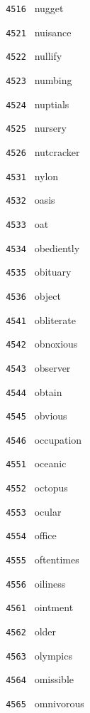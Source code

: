 \documentclass[11pt]{article}
\begin{document}
\begin{multicols}{6}
\noindent \texttt{ 4516 } nugget  \par
\vspace{3mm}
\noindent \texttt{ 4521 } nuisance  \par
\noindent \texttt{ 4522 } nullify  \par
\noindent \texttt{ 4523 } numbing  \par
\noindent \texttt{ 4524 } nuptials  \par
\noindent \texttt{ 4525 } nursery  \par
\noindent \texttt{ 4526 } nutcracker  \par
\vspace{3mm}
\noindent \texttt{ 4531 } nylon  \par
\noindent \texttt{ 4532 } oasis  \par
\noindent \texttt{ 4533 } oat  \par
\noindent \texttt{ 4534 } obediently  \par
\noindent \texttt{ 4535 } obituary  \par
\noindent \texttt{ 4536 } object  \par
\vspace{3mm}
\noindent \texttt{ 4541 } obliterate  \par
\noindent \texttt{ 4542 } obnoxious  \par
\noindent \texttt{ 4543 } observer  \par
\noindent \texttt{ 4544 } obtain  \par
\noindent \texttt{ 4545 } obvious  \par
\noindent \texttt{ 4546 } occupation  \par
\vspace{3mm}
\noindent \texttt{ 4551 } oceanic  \par
\noindent \texttt{ 4552 } octopus  \par
\noindent \texttt{ 4553 } ocular  \par
\noindent \texttt{ 4554 } office  \par
\noindent \texttt{ 4555 } oftentimes  \par
\noindent \texttt{ 4556 } oiliness  \par
\vspace{3mm}
\noindent \texttt{ 4561 } ointment  \par
\noindent \texttt{ 4562 } older  \par
\noindent \texttt{ 4563 } olympics  \par
\noindent \texttt{ 4564 } omissible  \par
\noindent \texttt{ 4565 } omnivorous  \par

\end{multicols}
\end{document}
